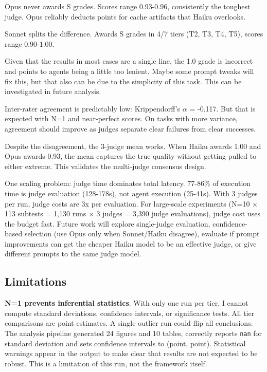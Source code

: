 \documentclass[11pt]{article}
\begin{document}
Opus never awards S grades. Scores range 0.93-0.96, consistently the toughest
judge. Opus reliably deducts points for cache artifacts that Haiku overlooks.

Sonnet splits the difference. Awards S grades in 4/7 tiers (T2, T3, T4, T5),
scores range 0.90-1.00.

Given that the results in most cases are a single line, the 1.0 grade is
incorrect and points to agents being a little too lenient. Maybe some prompt
tweaks will fix this, but that also can be due to the simplicity of this task.
This can be investigated in future analysis.

Inter-rater agreement is predictably low: Krippendorff's $\alpha$ = -0.117. But that is
expected with N=1 and near-perfect scores. On tasks with more variance,
agreement should improve as judges separate clear failures from clear successes.

Despite the disagreement, the 3-judge mean works. When Haiku awards 1.00 and
Opus awards 0.93, the mean captures the true quality without getting pulled to
either extreme. This validates the multi-judge consensus design.

One scaling problem: judge time dominates total latency. 77-86\% of execution
time is judge evaluation (128-178s), not agent execution (25-41s). With 3 judges
per run, judge costs are 3x per evaluation. For large-scale experiments (N=10 $\times$
113 subtests = 1,130 runs $\times$ 3 judges = 3,390 judge evaluations), judge cost uses
the budget fast. Future work will explore single-judge evaluation,
confidence-based selection (use Opus only when Sonnet/Haiku disagree), evaluate
if prompt improvements can get the cheaper Haiku model to be an effective judge,
or give different prompts to the same judge model.

\subsection{Limitations}

\textbf{N=1 prevents inferential statistics}. With only one run per tier, I cannot
compute standard deviations, confidence intervals, or significance tests. All
tier comparisons are point estimates. A single outlier run could flip all
conclusions. The analysis pipeline generated 24 figures and 10 tables, correctly reports \texttt{nan} for standard
deviation and sets confidence intervals to (point, point). Statistical warnings
appear in the output to make clear that results are not expected to be robust.
This is a limitation of this run, not the framework itself.
\end{document}
